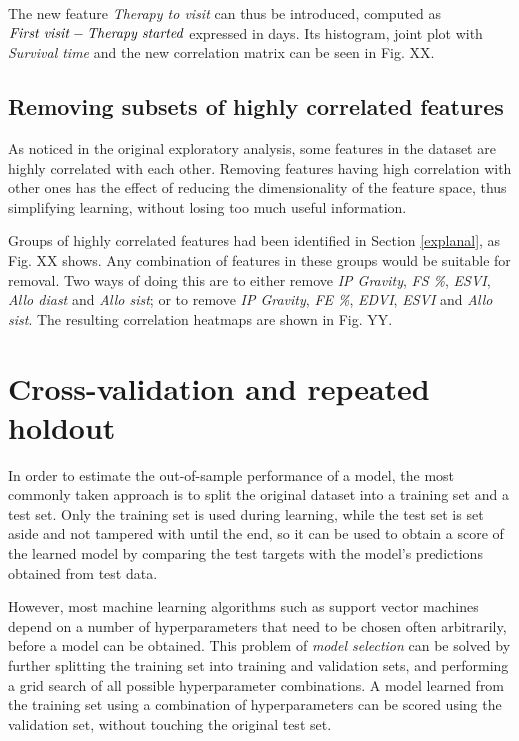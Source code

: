 \documentclass[12pt]{report}
\begin{document}
The new feature \textit{Therapy to visit} can thus be introduced, computed as $ \text{\emph{First visit}} - \text{\emph{Therapy started}} $ expressed in days. Its histogram, joint plot with \textit{Survival time} and the new correlation matrix can be seen in Fig. XX.

\subsection*{Removing subsets of highly correlated features}
As noticed in the original exploratory analysis, some features in the dataset are highly correlated with each other. Removing features having high correlation with other ones has the effect of reducing the dimensionality of the feature space, thus simplifying learning, without losing too much useful information.

Groups of highly correlated features had been identified in Section \ref{explanal}, as Fig. XX shows. Any combination of features in these groups would be suitable for removal. Two ways of doing this are to either remove \textit{IP Gravity}, \textit{FS \%}, \textit{ESVI}, \textit{Allo diast} and \textit{Allo sist}; or to remove \textit{IP Gravity}, \textit{FE \%}, \textit{EDVI}, \textit{ESVI} and \textit{Allo sist}. The resulting correlation heatmaps are shown in Fig. YY.

\section{Cross-validation and repeated holdout}
In order to estimate the out-of-sample performance of a model, the most commonly taken approach is to split the original dataset into a training set and a test set. Only the training set is used during learning, while the test set is set aside and not tampered with until the end, so it can be used to obtain a score of the learned model by comparing the test targets with the model's predictions obtained from test data.

However, most machine learning algorithms such as support vector machines depend on a number of hyperparameters that need to be chosen often arbitrarily, before a model can be obtained. This problem of \textit{model selection} can be solved by further splitting the training set into training and validation sets, and performing a grid search of all possible hyperparameter combinations. A model learned from the training set using a combination of hyperparameters can be scored using the validation set, without touching the original test set.
\end{document}
